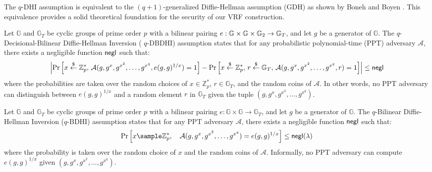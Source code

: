 \begin{remark}
The $q$-DHI assumption is equivalent to the $(q+1)$-generalized Diffie-Hellman assumption (GDH) as shown by Boneh and Boyen \cite{kanade_efficient_2004}. This equivalence provides a solid theoretical foundation for the security of our VRF construction.
\end{remark}

\begin{definition}
Let $\mathbb{G}$ and $\mathbb{G}_T$ be cyclic groups of prime order $p$ with a bilinear pairing $e: \mathbb{G} \times \mathbb{G} \times \mathbb{G}_2 \to \mathbb{G}_T$, and let $g$ be a generator of $\mathbb{G}$. The $q$-Decisional-Bilinear Diffie-Hellman Inversion ( $q$-DBDHI) assumption states that for any probabilistic polynomial-time (PPT) adversary $\mathcal{A}$, there exists a negligible function $\mathsf{negl}$ such that:
\[
\left| \Pr\left[ x \stackrel{\$}{\leftarrow} \mathbb{Z}_p^*, \, \mathcal{A}(g, g^x, g^{x^2}, \ldots, g^{x^q}, e(g, g)^{1/x}) = 1 \right] - \Pr\left[ x \stackrel{\$}{\leftarrow} \mathbb{Z}_p^*, \, r \stackrel{\$}{\leftarrow} \mathbb{G}_T, \, \mathcal{A}(g, g^x, g^{x^2}, \ldots, g^{x^q}, r) = 1 \right] \right| \leq \mathsf{negl}
\]
where the probabilities are taken over the random choices of $x \in \mathbb{Z}_p^*$, $r \in \mathbb{G}_T$, and the random coins of $\mathcal{A}$. In other words, no PPT adversary can distinguish between $e(g, g)^{1/x}$ and a random element $r$ in $\mathbb{G}_T$ given the tuple $(g, g^x, g^{x^2}, \ldots, g^{x^q})$.
\end{definition}



\begin{definition}
Let $\mathbb{G}$ and $\mathbb{G}_T$ be cyclic groups of prime order $p$ with a bilinear pairing $e: \mathbb{G} \times \mathbb{G} \to \mathbb{G}_T$, and let $g$ be a generator of $\mathbb{G}$. The $q$-Bilinear Diffie-Hellman Inversion ($q$-BDHI) assumption states that for any PPT adversary $\mathcal{A}$, there exists a negligible function $\mathsf{negl}$ such that:
\[
\Pr\left[ x \sample \mathbb{Z}_p^*, \quad \mathcal{A}(g, g^x, g^{x^2}, \ldots, g^{x^q}) = e(g, g)^{1/x} \right] \leq \negl(\lambda)
\]
where the probability is taken over the random choice of $x$ and the random coins of $\mathcal{A}$. Informally, no PPT adversary can compute $e(g, g)^{1/x}$ given $(g, g^x, g^{x^2}, \ldots, g^{x^q})$.
\end{definition}




